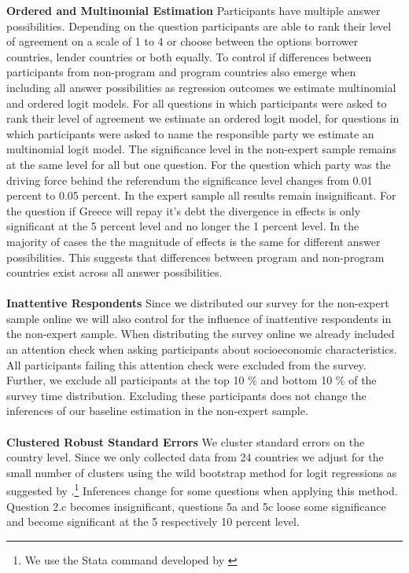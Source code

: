 \documentclass[12pt]{article}
\begin{document}
\textbf{Ordered and Multinomial Estimation}
Participants have multiple answer possibilities. Depending on the question participants are able to rank their level of agreement on a scale of 1 to 4 or choose between the options borrower countries, lender countries or both equally. To control if differences between participants from non-program and program countries also emerge when including all answer possibilities as regression outcomes we estimate multinomial and ordered logit models. For all questions in which participants were asked to rank their level of agreement we estimate an ordered logit model, for questions in which participants were asked to name the responsible party we estimate an multinomial logit model. The significance level in the non-expert sample remains at the same level for all but one question. For the question which party was the driving force behind the referendum the significance level changes from 0.01 percent to 0.05 percent. In the expert sample all results remain insignificant. For the question if Greece will repay it's debt the divergence in effects is only significant at the 5 percent level and no longer the 1 percent level. In the majority of cases the the magnitude of effects is the same for different answer possibilities. This suggests that differences between program and non-program countries exist across all answer possibilities. \\

\\
\textbf{Inattentive Respondents}
Since we distributed our survey for the non-expert sample online we will also control for the influence of inattentive respondents in the non-expert sample. When distributing the survey online we already included an attention check when asking participants about socioeconomic characteristics. All participants failing this attention check were excluded from the survey. Further, we exclude all participants at the top 10 $\%$ and bottom 10 $\%$ of the survey time distribution. Excluding these participants does not change the inferences of our baseline estimation in the non-expert sample.\\


\\
\textbf{Clustered Robust Standard Errors} 
We cluster standard errors on the country level. Since we only collected data from 24 countries we adjust for the small number of clusters using the wild bootstrap method for logit regressions as suggested by \cite{cameron}.\footnote{We use the Stata command developed by \cite{roodman}} Inferences change for some questions when applying this method. Question 2.c becomes insignificant, questions 5a and 5c loose some significance and become significant at the 5 respectively 10 percent level.  \\
\end{document}
